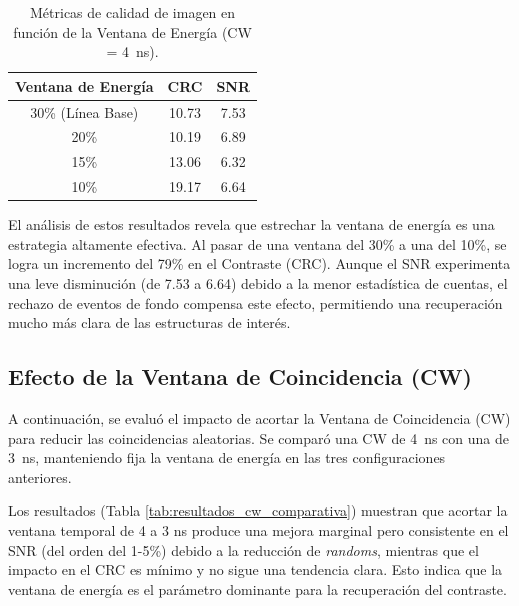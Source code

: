\begin{table}[htbp]
    \centering
    \caption{Métricas de calidad de imagen en función de la Ventana de Energía (CW = \SI{4}{\nano\second}).}
    \label{tab:resultados_ew}
    \begin{tabular}{c c c}
        \hline
        \textbf{Ventana de Energía} & \textbf{CRC} & \textbf{SNR} \\
        \hline
        30\% (Línea Base)           & 10.73        & 7.53         \\
        20\%                        & 10.19        & 6.89         \\
        15\%                        & 13.06        & 6.32         \\
        10\%                        & 19.17        & 6.64         \\
        \hline
    \end{tabular}
\end{table}

El análisis de estos resultados revela que estrechar la ventana de energía es una estrategia altamente efectiva. Al pasar de una ventana del 30\% a una del 10\%, se logra un incremento del 79\% en el Contraste (CRC). Aunque el SNR experimenta una leve disminución (de 7.53 a 6.64) debido a la menor estadística de cuentas, el rechazo de eventos de fondo compensa este efecto, permitiendo una recuperación mucho más clara de las estructuras de interés.

\subsection{Efecto de la Ventana de Coincidencia (CW)}
\label{subsec:resultados_cw}

A continuación, se evaluó el impacto de acortar la Ventana de Coincidencia (CW) para reducir las coincidencias aleatorias. Se comparó una CW de \SI{4}{\nano\second} con una de \SI{3}{\nano\second}, manteniendo fija la ventana de energía en las tres configuraciones anteriores.

Los resultados (Tabla \ref{tab:resultados_cw_comparativa}) muestran que acortar la ventana temporal de 4 a 3 ns produce una mejora marginal pero consistente en el SNR (del orden del 1-5\%) debido a la reducción de \textit{randoms}, mientras que el impacto en el CRC es mínimo y no sigue una tendencia clara. Esto indica que la ventana de energía es el parámetro dominante para la recuperación del contraste.

